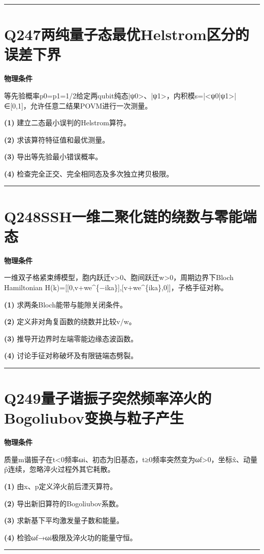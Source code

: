 \documentclass[UTF8,a4paper,11pt,oneside,openany]{ctexbook}
\begin{document}
\par\bigskip\hrule\bigskip
\section*{Q247\quad 两纯量子态最优Helstrom区分的误差下界}
\textbf{物理条件}\par 等先验概率p0=p1=1/2给定两qubit纯态|ψ0>、|ψ1>，内积模s=|<ψ0|ψ1>|∈[0,1]，允许任意二结果POVM进行一次测量。
\par\noindent\textbf{(1)} 建立二态最小误判的Helstrom算符。
\par\noindent\textbf{(2)} 求该算符特征值和最优测量。
\par\noindent\textbf{(3)} 导出等先验最小错误概率。
\par\noindent\textbf{(4)} 检查完全正交、完全相同态及多次独立拷贝极限。

\par\bigskip\hrule\bigskip
\section*{Q248\quad SSH一维二聚化链的绕数与零能端态}
\textbf{物理条件}\par 一维双子格紧束缚模型，胞内跃迁v>0、胞间跃迁w>0，周期边界下Bloch Hamiltonian H(k)=[[0,v+we\textasciicircum{}\{−ika\}],[v+we\textasciicircum{}\{ika\},0]]，子格手征对称。
\par\noindent\textbf{(1)} 求两条Bloch能带与能隙关闭条件。
\par\noindent\textbf{(2)} 定义非对角复函数的绕数并比较v/w。
\par\noindent\textbf{(3)} 推导开边界时左端零能边缘态波函数。
\par\noindent\textbf{(4)} 讨论手征对称破坏及有限链端态劈裂。

\par\bigskip\hrule\bigskip
\section*{Q249\quad 量子谐振子突然频率淬火的Bogoliubov变换与粒子产生}
\textbf{物理条件}\par 质量m谐振子在t<0频率ωi、初态为旧基态，t≥0频率突然变为ωf>0，坐标x̂、动量p̂连续，忽略淬火过程外其它耗散。
\par\noindent\textbf{(1)} 由x、p定义淬火前后湮灭算符。
\par\noindent\textbf{(2)} 导出新旧算符的Bogoliubov系数。
\par\noindent\textbf{(3)} 求新基下平均激发量子数和能量。
\par\noindent\textbf{(4)} 检验ωf→ωi极限及淬火功的能量守恒。

\par\bigskip\hrule\bigskip
\end{document}
